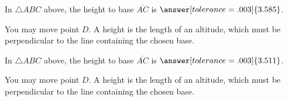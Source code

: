 \documentclass[nooutcomes]{ximera}
\begin{document}
\begin{center}  
\end{center}
\begin{problem}
In $\triangle ABC$ above, the height to base $\overline{AC}$ is $\answer[tolerance=.003]{3.585}$.
\begin{hint}
You may move point $D$.  A height is the length of an altitude, which must be perpendicular to the line containing the chosen base.  
\end{hint}
\end{problem}

\begin{center}  
\end{center}
\begin{problem}
In $\triangle ABC$ above, the height to base $\overline{AC}$ is $\answer[tolerance=.003]{3.511}$.
\begin{hint}
You may move point $D$.  A height is the length of an altitude, which must be perpendicular to the line containing the chosen base.  
\end{hint}
\end{problem}
\end{document}
